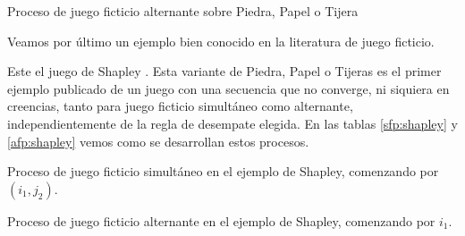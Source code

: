 \begin{table} %
    \centering
    
    \caption{Proceso de juego ficticio alternante sobre Piedra, Papel o Tijera}
    \label{afp:piedra:papel:tijera}
\end{table}

Veamos por último un ejemplo bien conocido en la literatura de juego ficticio.



Este el juego de Shapley \cite{shapley:3x3}. Esta variante de Piedra, Papel o Tijeras es el primer ejemplo publicado de un juego con una secuencia que no converge, ni siquiera en creencias, tanto para juego ficticio simultáneo como alternante, independientemente de la regla de desempate elegida. En las tablas \ref{sfp:shapley} y \ref{afp:shapley} vemos como se desarrollan estos procesos.


\begin{table} %
    \centering
    
    \caption{Proceso de juego ficticio simultáneo en el ejemplo de Shapley, comenzando por $(i_1, j_2)$.}
    \label{sfp:shapley}
\end{table}
\begin{table} %
    \centering
    
    \caption{Proceso de juego ficticio alternante en el ejemplo de Shapley, comenzando por $i_1$.}
    \label{afp:shapley}
\end{table}

